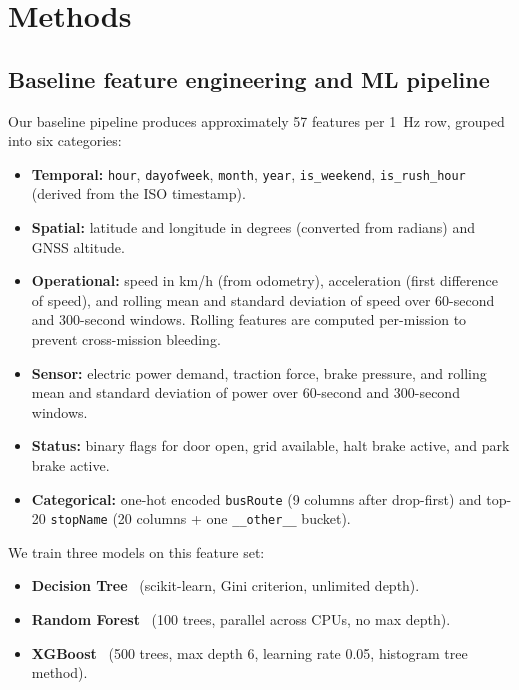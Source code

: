 \section{Methods}
\label{sec:methods}

\subsection{Baseline feature engineering and ML pipeline}
\label{sec:methods-baseline}

Our baseline pipeline produces approximately 57 features per 1~Hz row,
grouped into six categories:

\begin{itemize}
  \item \textbf{Temporal:} \texttt{hour}, \texttt{dayofweek}, \texttt{month},
    \texttt{year}, \texttt{is\_weekend}, \texttt{is\_rush\_hour} (derived
    from the ISO timestamp).
  \item \textbf{Spatial:} latitude and longitude in degrees (converted from
    radians) and GNSS altitude.
  \item \textbf{Operational:} speed in km/h (from odometry), acceleration
    (first difference of speed), and rolling mean and standard deviation of
    speed over 60-second and 300-second windows. Rolling features are
    computed per-mission to prevent cross-mission bleeding.
  \item \textbf{Sensor:} electric power demand, traction force, brake
    pressure, and rolling mean and standard deviation of power over 60-second
    and 300-second windows.
  \item \textbf{Status:} binary flags for door open, grid available,
    halt brake active, and park brake active.
  \item \textbf{Categorical:} one-hot encoded \texttt{busRoute} (9 columns
    after drop-first) and top-20 \texttt{stopName} (20 columns + one
    \texttt{\_\_other\_\_} bucket).
\end{itemize}

We train three models on this feature set:
\begin{itemize}
  \item \textbf{Decision Tree}~\cite{pedregosa2011sklearn} (scikit-learn,
    Gini criterion, unlimited depth).
  \item \textbf{Random Forest}~\cite{breiman2001rf} (100 trees, parallel
    across CPUs, no max depth).
  \item \textbf{XGBoost}~\cite{chen2016xgboost} (500 trees, max depth 6,
    learning rate 0.05, histogram tree method).
\end{itemize}

